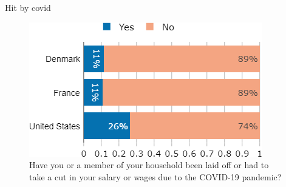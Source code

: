 \documentclass[aspectratio=169,9pt,dvipsnames]{beamer}
\begin{document}

\begin{frame}{Hit by covid}%
\begin{figure}[h!]
\caption{Have you or a member of your household been laid off or had to take a cut in your salary or wages due to the COVID-19 pandemic?}
\includegraphics[width=.55\textwidth]{../figures/country_comparison/hit_by_covid_countries.png}
\end{figure}
\end{frame}

\end{document}
